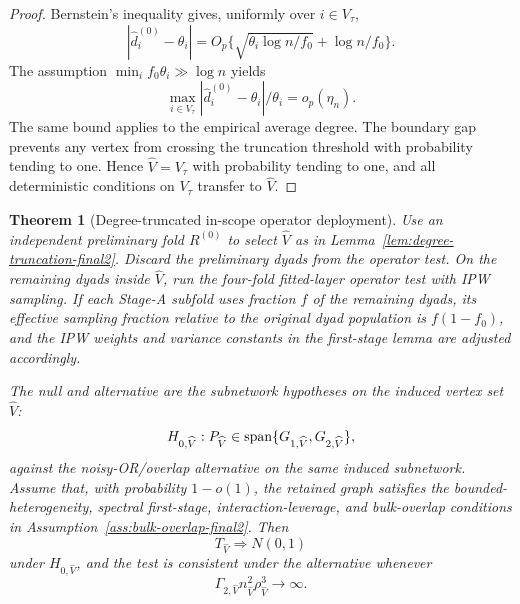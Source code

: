 \documentclass[12pt]{article}
\newtheorem{theorem}{Theorem}
\newcommand{\1}{\mathbf{1}}
\begin{document}
\begin{proof}
Bernstein's inequality gives, uniformly over \(i\in V_\tau\),
\[
  |\widehat d_i^{(0)}-\theta_i|
  =
  O_p\{\sqrt{\theta_i\log n/f_0}+\log n/f_0\}.
\]
The assumption \(\min_i f_0\theta_i\gg\log n\) yields
\[
  \max_{i\in V_\tau}
  |\widehat d_i^{(0)}-\theta_i|/\theta_i=o_p(\eta_n).
\]
The same bound applies to the empirical average degree.  The boundary
gap prevents any vertex from crossing the truncation threshold with
probability tending to one.  Hence \(\widehat V=V_\tau\) with probability
tending to one, and all deterministic conditions on \(V_\tau\) transfer
to \(\widehat V\).
\end{proof}

\begin{theorem}[Degree-truncated in-scope operator deployment]
\label{thm:truncated-operator-final2}
Use an independent preliminary fold \(R^{(0)}\) to select \(\widehat V\)
as in Lemma~\ref{lem:degree-truncation-final2}.  Discard the preliminary
dyads from the operator test.  On the remaining dyads inside
\(\widehat V\), run the four-fold fitted-layer operator test with IPW
sampling.  If each Stage-A subfold uses fraction \(f\) of the remaining
dyads, its effective sampling fraction relative to the original dyad
population is \(f(1-f_0)\), and the IPW weights and variance constants in
the first-stage lemma are adjusted accordingly.

The null and alternative are the subnetwork hypotheses on the induced
vertex set \(\widehat V\):
\[
  H_{0,\widehat V}: P_{\widehat V}\in
  {\rm span}\{G_{1,\widehat V},G_{2,\widehat V}\},
\]
against the noisy-OR/overlap alternative on the same induced subnetwork.
Assume that, with probability \(1-o(1)\), the retained graph satisfies
the bounded-heterogeneity, spectral first-stage, interaction-leverage,
and bulk-overlap conditions in
Assumption~\ref{ass:bulk-overlap-final2}.  Then
\[
  T_{\widehat V}\Rightarrow N(0,1)
\]
under \(H_{0,\widehat V}\), and the test is consistent under the
alternative whenever
\[
  \Gamma_{2,\widehat V}n_{\widehat V}^2\rho_{\widehat V}^3\to\infty.
\]
\end{theorem}
\end{document}
